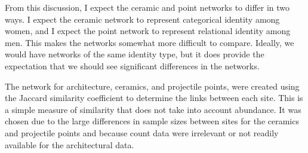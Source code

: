 \documentclass[]{interact}
\theoremstyle{plain}%
\theoremstyle{definition}
\theoremstyle{remark}
\begin{document}
From this discussion, I expect the ceramic and point networks to differ
in two ways. I expect the ceramic network to represent categorical
identity among women, and I expect the point network to represent
relational identity among men. This makes the networks somewhat more
difficult to compare. Ideally, we would have networks of the same
identity type, but it does provide the expectation that we should see
significant differences in the networks.

The network for architecture, ceramics, and projectile points, were
created using the Jaccard similarity coefficient \citep{Jaccard1912-na}
to determine the links between each site. This is a simple measure of
similarity that does not take into account abundance. It was chosen due
to the large differences in sample sizes between sites for the ceramics
and projectile points and because count data were irrelevant or not
readily available for the architectural data.

\begin{table}

\caption{\label{tab:sites}Project Sites and Data}
\centering
{}
\end{table}
\end{document}
